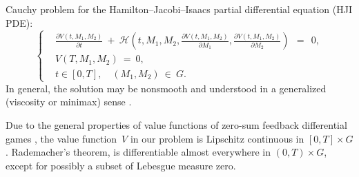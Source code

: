 \documentclass[11pt]{amsart}
\begin{document}
Cauchy problem for the Hamilton--Jacobi--Isaacs partial differential equation (HJI PDE):
\begin{equation}
\left\{ \begin{aligned}
& \frac{\partial V(t, M_1, M_2)}{\partial t} \: + \: \mathcal{H} \left( t, M_1, M_2,
\frac{\partial V(t, M_1, M_2)}{\partial M_1}, \frac{\partial V(t, M_1, M_2)}{\partial M_2} \right) \:\: = \:\: 0, \\
& V(T, M_1, M_2) \: = \: 0, \\
& t \in [0, T], \quad (M_1, M_2) \: \in \: G.
\end{aligned} \right.  \label{15}
\end{equation}
In general, the solution may be nonsmooth and understood in a generalized (viscosity or minimax) sense
\cite{FlemingSoner2006,Subbotin1995}.

Due to the general properties of value functions of zero-sum feedback differential games \cite{BotkinHoffmannTurova2011},
the value function~$ V $ in our problem is Lipschitz continuous in $ [0, T] \times G $. Rademacher's theorem, is
differentiable almost everywhere in $ (0, T) \times G $, except for possibly a subset of Lebesgue measure zero.
\end{document}
